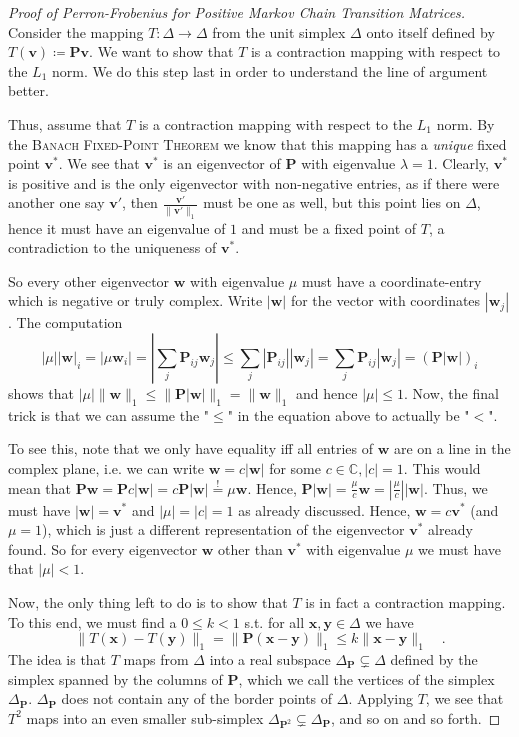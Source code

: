 \documentclass[../../main.tex]{subfiles}
\begin{document}
\begin{proof}[Proof of Perron-Frobenius for Positive Markov Chain Transition Matrices]
    ~\\
    Consider the mapping $T: \Delta \to \Delta$ from the unit simplex $\Delta$ onto itself defined by $T(\bm{v}) \coloneqq \bm{Pv}$. We want to show that $T$ is a contraction mapping with respect to the $L_1$ norm. We do this step last in order to understand the line of argument better.
    
    Thus, assume that $T$ is a contraction mapping with respect to the $L_1$ norm. By the \textsc{Banach Fixed-Point Theorem} we know that this mapping has a \emph{unique} fixed point $\bm{v}^*$. We see that $\bm{v}^*$ is an eigenvector of $\bm{P}$ with eigenvalue $\lambda = 1$. Clearly, $\bm{v}^*$ is positive and is the only eigenvector with non-negative entries, as if there were another one say $\bm{v}'$, then $\frac{\bm{v}'}{\|\bm{v}'\|_1}$ must be one as well, but this point lies on $\Delta$, hence it must have an eigenvalue of $1$ and must be a fixed point of $T$, a contradiction to the uniqueness of $\bm{v}^*$.

    So every other eigenvector $\bm{w}$ with eigenvalue $\mu$ must have a coordinate-entry which is negative or truly complex. Write $|\bm{w}|$ for the vector with coordinates $|\bm{w}_j|$. The computation
    \[
        |\mu||\bm{w}|_i = |\mu \bm{w}_i| = |\sum_{j} \bm{P}_{ij} \bm{w}_j| \leq \sum_{j} |\bm{P}_{ij}| |\bm{w}_j| = \sum_{j} \bm{P}_{ij} |\bm{w}_j| = (\bm{P} |\bm{w}|)_i
    \]
    shows that $|\mu| \|\bm{w}\|_1 \leq \|\bm{P} |\bm{w}|\|_1 = \|\bm{w}\|_1$ and hence $|\mu| \leq 1$. Now, the final trick is that we can assume the "$\leq$" in the equation above to actually be "$<$".

    To see this, note that we only have equality iff all entries of $\bm{w}$ are on a line in the complex plane, i.e. we can write $\bm{w} = c |\bm{w}|$ for some $c \in \mathbb{C}, |c| = 1$. This would mean that $\bm{P} \bm{w} = \bm{P} c |\bm{w}| = c \bm{P} |\bm{w}| \overset{!}{=} \mu \bm{w}$. Hence, $\bm{P} |\bm{w}| = \frac{\mu}{c} \bm{w} = |\frac{\mu}{c}| |\bm{w}|$. Thus, we must have $|\bm{w}| = \bm{v}^*$ and $|\mu| = |c| = 1$ as already discussed. Hence, $\bm{w} = c \bm{v}^*$ (and $\mu = 1$), which is just a different representation of the eigenvector $\bm{v}^*$ already found. So for every eigenvector $\bm{w}$ other than $\bm{v}^*$ with eigenvalue $\mu$ we must have that $|\mu| < 1$.

    \smallskip
    Now, the only thing left to do is to show that $T$ is in fact a contraction mapping. To this end, we must find a $0 \leq k < 1$ s.t. for all $\bm{x}, \bm{y} \in \Delta$ we have
    \[
        \|T(\bm{x}) - T(\bm{y})\|_1 = \|\bm{P} (\bm{x} - \bm{y})\|_1 \leq k \|\bm{x} - \bm{y}\|_1 \quad .
    \]
    The idea is that $T$ maps from $\Delta$ into a real subspace $\Delta_{\bm{P}} \subsetneq \Delta$ defined by the simplex spanned by the columns of $\bm{P}$, which we call the vertices of the simplex $\Delta_{\bm{P}}$. $\Delta_{\bm{P}}$ does not contain any of the border points of $\Delta$. Applying $T$, we see that $T^2$ maps into an even smaller sub-simplex $\Delta_{\bm{P}^2} \subsetneq \Delta_{\bm{P}}$, and so on and so forth.


\end{proof}
\end{document}
